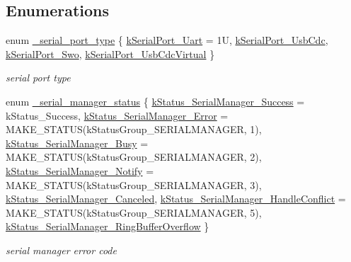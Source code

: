 \subsection*{Enumerations}
\begin{DoxyCompactItemize}
\item 
enum \mbox{\hyperlink{group__serialmanager_ga37012d03963b0a7aac96cda088362180}{\+\_\+serial\+\_\+port\+\_\+type}} \{ \mbox{\hyperlink{group__serialmanager_gga37012d03963b0a7aac96cda088362180a5b4d039d8c91cb19fca7c5dc196f8d77}{k\+Serial\+Port\+\_\+\+Uart}} = 1U, 
\mbox{\hyperlink{group__serialmanager_gga37012d03963b0a7aac96cda088362180a3785825f30826c61a4ef13bf983381c2}{k\+Serial\+Port\+\_\+\+Usb\+Cdc}}, 
\mbox{\hyperlink{group__serialmanager_gga37012d03963b0a7aac96cda088362180af6a37935b2767a9ae22825f0bc49ef77}{k\+Serial\+Port\+\_\+\+Swo}}, 
\mbox{\hyperlink{group__serialmanager_gga37012d03963b0a7aac96cda088362180a364a995b9a86d7f512d3114d998cbaad}{k\+Serial\+Port\+\_\+\+Usb\+Cdc\+Virtual}}
 \}
\begin{DoxyCompactList}\small\item\em serial port type \end{DoxyCompactList}\item 
enum \mbox{\hyperlink{group__serialmanager_ga936dd06c6718edc81ad0423a2bb04ad8}{\+\_\+serial\+\_\+manager\+\_\+status}} \{ \newline
\mbox{\hyperlink{group__serialmanager_gga936dd06c6718edc81ad0423a2bb04ad8a1e4ed7376c48b94ec9a60f272a629ed4}{k\+Status\+\_\+\+Serial\+Manager\+\_\+\+Success}} = k\+Status\+\_\+\+Success, 
\mbox{\hyperlink{group__serialmanager_gga936dd06c6718edc81ad0423a2bb04ad8a61e6a331c5f789fe88fcf2bacf8a5553}{k\+Status\+\_\+\+Serial\+Manager\+\_\+\+Error}} = M\+A\+K\+E\+\_\+\+S\+T\+A\+T\+US(k\+Status\+Group\+\_\+\+S\+E\+R\+I\+A\+L\+M\+A\+N\+A\+G\+ER, 1), 
\mbox{\hyperlink{group__serialmanager_gga936dd06c6718edc81ad0423a2bb04ad8a67e18fb1e47f4f40dc58988b76a2d876}{k\+Status\+\_\+\+Serial\+Manager\+\_\+\+Busy}} = M\+A\+K\+E\+\_\+\+S\+T\+A\+T\+US(k\+Status\+Group\+\_\+\+S\+E\+R\+I\+A\+L\+M\+A\+N\+A\+G\+ER, 2), 
\mbox{\hyperlink{group__serialmanager_gga936dd06c6718edc81ad0423a2bb04ad8abdcdea0fcd8b4c01592728a4ba041154}{k\+Status\+\_\+\+Serial\+Manager\+\_\+\+Notify}} = M\+A\+K\+E\+\_\+\+S\+T\+A\+T\+US(k\+Status\+Group\+\_\+\+S\+E\+R\+I\+A\+L\+M\+A\+N\+A\+G\+ER, 3), 
\newline
\mbox{\hyperlink{group__serialmanager_gga936dd06c6718edc81ad0423a2bb04ad8af01c3a38751393325ab9791d8181ef38}{k\+Status\+\_\+\+Serial\+Manager\+\_\+\+Canceled}}, 
\mbox{\hyperlink{group__serialmanager_gga936dd06c6718edc81ad0423a2bb04ad8a9f087536c7a9930159682ed03d8d71ea}{k\+Status\+\_\+\+Serial\+Manager\+\_\+\+Handle\+Conflict}} = M\+A\+K\+E\+\_\+\+S\+T\+A\+T\+US(k\+Status\+Group\+\_\+\+S\+E\+R\+I\+A\+L\+M\+A\+N\+A\+G\+ER, 5), 
\mbox{\hyperlink{group__serialmanager_gga936dd06c6718edc81ad0423a2bb04ad8a41631953d2191b631fbe8443bfa856c8}{k\+Status\+\_\+\+Serial\+Manager\+\_\+\+Ring\+Buffer\+Overflow}}
 \}
\begin{DoxyCompactList}\small\item\em serial manager error code \end{DoxyCompactList}\end{DoxyCompactItemize}
